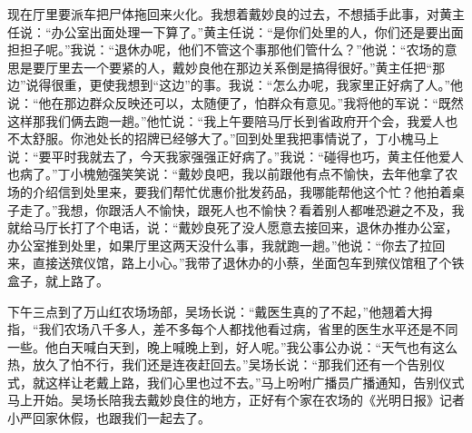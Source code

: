 \documentclass[12pt,oneside]{book}
\begin{document}
现在厅里要派车把尸体拖回来火化。我想着戴妙良的过去，不想插手此事，对黄主任说：``办公室出面处理一下算了。''黄主任说：``是你们处里的人，你们还是要出面担担子呢。''我说：``退休办呢，他们不管这个事那他们管什么？''他说：``农场的意思是要厅里去一个要紧的人，戴妙良他在那边关系倒是搞得很好。''黄主任把``那边''说得很重，更使我想到``这边''的事。我说：``怎么办呢，我家里正好病了人。''他说：``他在那边群众反映还可以，太随便了，怕群众有意见。''我将他的军说：``既然这样那我们俩去跑一趟。''他忙说：``我上午要陪马厅长到省政府开个会，我爱人也不太舒服。你池处长的招牌已经够大了。''回到处里我把事情说了，丁小槐马上说：``要平时我就去了，今天我家强强正好病了。''我说：``碰得也巧，黄主任他爱人也病了。''丁小槐勉强笑笑说：``戴妙良吧，我以前跟他有点不愉快，去年他拿了农场的介绍信到处里来，要我们帮忙优惠价批发药品，我哪能帮他这个忙？他拍着桌子走了。''我想，你跟活人不愉快，跟死人也不愉快？看着别人都唯恐避之不及，我就给马厅长打了个电话，说：``戴妙良死了没人愿意去接回来，退休办推办公室，办公室推到处里，如果厅里这两天没什么事，我就跑一趟。''他说：``你去了拉回来，直接送殡仪馆，路上小心。''我带了退休办的小蔡，坐面包车到殡仪馆租了个铁盒子，就上路了。

下午三点到了万山红农场场部，吴场长说：``戴医生真的了不起，''他翘着大拇指，``我们农场八千多人，差不多每个人都找他看过病，省里的医生水平还是不同一些。他白天喊白天到，晚上喊晚上到，好人呢。''我公事公办说：``天气也有这么热，放久了怕不行，我们还是连夜赶回去。''吴场长说：``那我们还有一个告别仪式，就这样让老戴上路，我们心里也过不去。''马上吩咐广播员广播通知，告别仪式马上开始。吴场长陪我去戴妙良住的地方，正好有个家在农场的《光明日报》记者小严回家休假，也跟我们一起去了。
\end{document}
